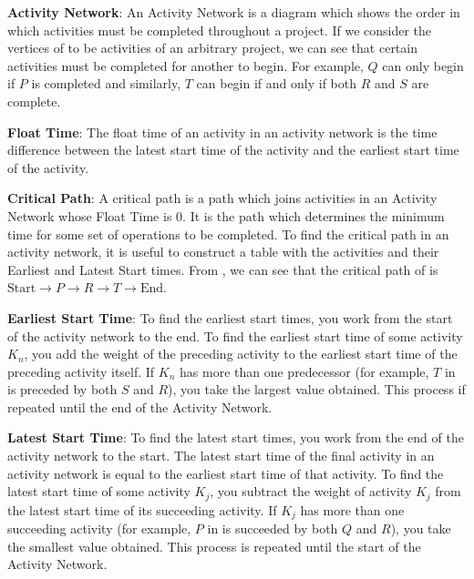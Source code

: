 \begin{defn}\label{mod1:defn:ActNet}
	\textbf{Activity Network}: An Activity Network is a diagram which shows the order in which activities must be completed throughout a project. If we consider the vertices of  to be activities of an arbitrary project, we can see that certain activities must be completed for another to begin. For example, $Q$ can only begin if $P$ is completed and similarly, $T$ can begin if and only if both $R$ and $S$ are complete. 
\end{defn}

\begin{defn}\label{mod1:defn:FloatTime}
	\textbf{Float Time}: The float time of an activity in an activity network is the time difference between the latest start time of the activity and the earliest start time of the activity.
\end{defn}

\begin{defn}\label{mod1:defn:CritPath}
	\textbf{Critical Path}: A critical path is a path which joins activities in an Activity Network whose Float Time is $0$. It is the path which determines the minimum time for some set of operations to be completed. To find the critical path in an activity network, it is useful to construct a table with the activities and their Earliest and Latest Start times. From , we can see that the critical path of  is $\text{Start} \rightarrow P \rightarrow R \rightarrow T \rightarrow \text{End}$.
\end{defn}
	
\begin{defn}\label{mod1:defn:EarliestStart}
	\textbf{Earliest Start Time}: To find the earliest start times, you work from the start of the activity network to the end. To find the earliest start time of some activity $K_n$, you add the weight of the preceding activity to the earliest start time of the preceding activity itself. If $K_n$ has more than one predecessor (for example, $T$ in  is preceded by both $S$ and $R$), you take the largest value obtained. This process if repeated until the end of the Activity Network. 
\end{defn}

\begin{defn}\label{mod1:defn:LatestStart}
	\textbf{Latest Start Time}: To find the latest start times, you work from the end of the activity network to the start. The latest start time of the final activity in an activity network is equal to the earliest start time of that activity. To find the latest start time of some activity $K_j$, you subtract the weight of activity $K_j$ from the latest start time of its succeeding activity. If $K_j$ has more than one succeeding activity (for example, $P$ in  is succeeded by both $Q$ and $R$), you take the smallest value obtained. This process is repeated until the start of the Activity Network.
\end{defn}

